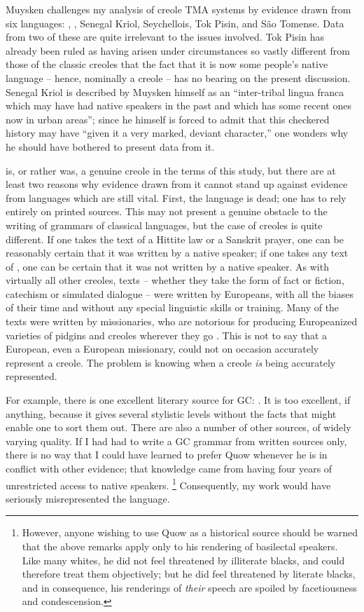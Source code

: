 Muysken challenges my analysis of creole TMA systems by evidence drawn from six languages: , , Senegal Kriol, Seychellois, Tok Pisin, and S{\~a}o Tomense. Data from two of these are quite irrelevant to the issues involved. Tok Pisin has already been ruled as having arisen under circumstances so vastly different from those of the classic creoles that the fact that it is now some people's %
native language -- hence, nominally a creole -- has no bearing on the present discussion. Senegal Kriol is described by Muysken himself as an ``inter-tribal lingua franca which may have had native speakers in the past and which has some recent ones now in urban areas''; since he himself is forced to admit that this checkered history may have ``given it a very marked, deviant character,'' one wonders why he should have bothered to present data from it.

 is, or rather was, a genuine creole in the terms of this study, but there are at least two reasons why evidence drawn from it cannot stand up against evidence from languages which are still vital. First, the language is dead; one has to rely entirely on printed sources. This may not present a genuine obstacle to the writing of grammars of classical languages, but the case of creoles is quite different. If one takes the text of a Hittite law or a Sanskrit prayer, one can be reasonably certain that it was written by a native speaker; if one takes any text of , one can be certain that it was not written by a native speaker. As with virtually all other creoles, texts -- whether they take the form of fact or fiction, catechism or simulated dialogue -- were written by Europeans, with all the biases of their time and without any special linguistic skills or training. Many of the texts were written by missionaries, who are notorious for producing Europeanized varieties of pidgins and creoles wherever they go \citep{Voorhoeve1971}. This is not to say that a European, even a European missionary, could not on occasion accurately represent a creole. The problem is knowing when a creole \textit{is} being accurately represented.

For example, there is one excellent literary source for GC: \citet{Quow1877}. It is too excellent, if anything, because it gives several stylistic levels without the facts that might enable one to sort them out. There are also a number of other sources, of widely varying quality. If I had had to write a GC grammar from written sources only, there is no way that I could have learned to prefer Quow whenever he is in conflict with other evidence; that knowledge came from having four years of unrestricted access to native speakers.%
\footnote{However, anyone wishing to use Quow as a historical source should be warned that the above remarks apply only to his rendering of basilectal speakers. Like many whites, he did not feel threatened by illiterate blacks, and could therefore treat them objectively; but he did feel threatened by literate blacks, and in consequence, his ren\-derings of \textit{their} speech are spoiled by facetiousness and condescension.}
Consequently, my work would have seriously misrepresented the language.

